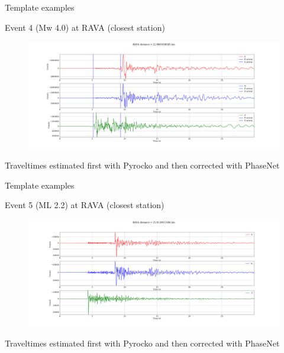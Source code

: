 \documentclass[aspectratio=43,9pt]{beamer}
\begin{document}
\begin{frame}{Template examples}

\centering Event 4 (Mw 4.0) at RAVA (closest station)
\begin{figure}
 \includegraphics[width=1\linewidth]{figs/event_4_RAVA.png}
\end{figure}

Traveltimes estimated first with Pyrocko and then corrected with PhaseNet

\end{frame}


\begin{frame}{Template examples}

\centering Event 5 (ML 2.2) at RAVA (closest station)
\begin{figure}
 \includegraphics[width=1\linewidth]{figs/event_5_RAVA.png}
\end{figure}

Traveltimes estimated first with Pyrocko and then corrected with PhaseNet

\end{frame}
\end{document}
